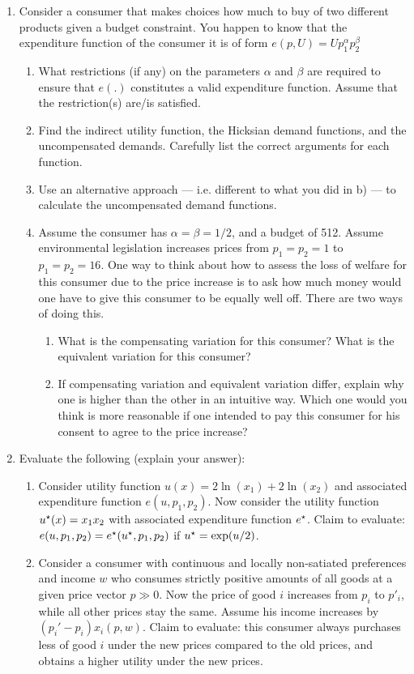 \documentclass[12pt]{article}
\begin{document}
\begin{enumerate}
\begin{enumerate}
	\end{enumerate}
	\item Consider a consumer that makes choices how much to buy of two different products given a budget constraint. You happen to know that the expenditure function of the consumer it is of form $e(p,U) = Up^\alpha_1 p_2^\beta$
	\begin{enumerate}
		\item What restrictions (if any) on the parameters $\alpha$ and $\beta$ are required to ensure that $e(.)$ constitutes a valid expenditure function. Assume that the restriction(s) are/is satisfied.
		\item Find the indirect utility function, the Hicksian demand functions, and the uncompensated demands. Carefully list the correct arguments for each function.
		\item Use an alternative approach — i.e. different to what you did in b) — to calculate the uncompensated demand functions.
		\item Assume the consumer has $\alpha = \beta = 1/2$, and a budget of 512. Assume environmental legislation increases prices from $p_1 = p_2 = 1$ to $p_1 = p_2 = 16$. One way to think about how to assess the loss of welfare for this consumer due to the price increase is to ask how much money would one have to give this consumer to be equally well off. There are two ways of doing this.
		\begin{enumerate}
			\item What is the compensating variation for this consumer? What is the equivalent variation for this consumer?
			\item If compensating variation and equivalent variation differ, explain why one is higher than the other in an intuitive way. Which one would you think is more reasonable if one intended to pay this consumer for his consent to agree to the price increase?
		\end{enumerate}
	\end{enumerate}
	\item Evaluate the following (explain your answer):
	\begin{enumerate}
		\item Consider utility function $u(x) = 2\ln(x_1) + 2\ln(x_2)$ and associated expenditure function $e(u,p_1,p_2)$. Now consider the utility function $u^\star(x) = x_1x_2$ with associated expenditure function $e^\star$. Claim to evaluate: $e(u,p_1,p_2) = e^\star(u^\star,p_1,p_2)$ if $u^\star = \exp(u / 2)$.
		\item Consider a consumer with continuous and locally non-satiated preferences and income $w$ who consumes strictly positive amounts of all goods at a given price vector $p\gg 0$. Now the price of good $i$ increases from $p_i$ to $p'_i$, while all other prices stay the same. Assume his income increases by $(p_i' - p_i)x_i(p,w)$. Claim to evaluate: this consumer always purchases less of good $i$ under the new prices compared to the old prices, and obtains a higher utility under the new prices.

\end{enumerate}
\end{enumerate}
\end{document}
